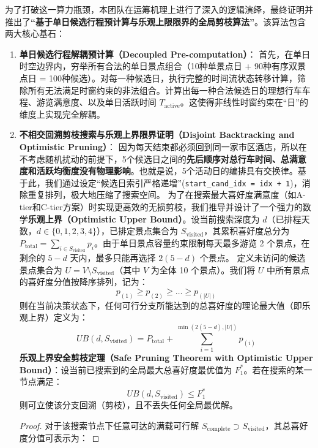 \documentclass{cumcmthesis}
\begin{document}
为了打破这一算力瓶颈，本团队在运筹机理上进行了深入的逻辑演绎，最终证明并推出了\textbf{“基于单日候选行程预计算与乐观上限限界的全局剪枝算法”}。该算法包含两大核心基石：
\begin{enumerate}
\item \textbf{单日候选行程解耦预计算（Decoupled Pre-computation）}：
首先，在单日时空边界内，穷举所有合法的单日景点组合（10种单景点日 + 90种有序双景点日 = 100种候选）。对每一种候选日，执行完整的时间流状态转移计算，筛除所有无法满足时窗约束的非法组合。计算出每一种合法候选日的理想行车车程、游览满意度、以及单日活跃时间 $T_{\text{active}}$。这使得非线性时窗约束在“日”的维度上实现完全解耦。
\item \textbf{不相交回溯剪枝搜索与乐观上界限界证明（Disjoint Backtracking and Optimistic Pruning）}：
因为每天结束都必须回到同一家市区酒店，所以在不考虑随机扰动的前提下，5个候选日之间的\textbf{先后顺序对总行车时间、总满意度和活跃均衡度没有物理影响}。也就是说，5个活动日的编排具有交换律。基于此，我们通过设定“候选日索引严格递增”(\texttt{start\_cand\_idx = idx + 1})，消除重复排列，极大地压缩了搜索空间。
为了在搜索最大喜好度满意度（如A-tier和C-tier方案）时实现更高效的无损剪枝，我们推导并设计了一个强力的数学\textbf{乐观上界（Optimistic Upper Bound）}。设当前搜索深度为 $d$（已排程天数，$d \in \{0, 1, 2, 3, 4\}$），已排定景点集合为 $S_{\text{visited}}$，其累积喜好度总分为 $P_{\text{total}} = \sum_{i \in S_{\text{visited}}} p_i$。由于单日景点容量约束限制每天最多游览 2 个景点，在剩余的 $5-d$ 天内，最多只能再选择 $2(5-d)$ 个景点。
定义未访问的候选景点集合为 $U = V \setminus S_{\text{visited}}$（其中 $V$ 为全体 10 个景点）。我们将 $U$ 中所有景点的喜好度分值按降序排列，记为：
\begin{equation}
p_{(1)} \ge p_{(2)} \ge \dots \ge p_{(|U|)}
\end{equation}
则在当前决策状态下，任何可行分支所能达到的总喜好度的理论最大值（即乐观上界）定义为：
\begin{equation}
UB(d, S_{\text{visited}}) = P_{\text{total}} + \sum_{i=1}^{\min\left(2(5-d), |U|\right)} p_{(i)}
\end{equation}
\textbf{乐观上界安全剪枝定理（Safe Pruning Theorem with Optimistic Upper Bound）}：设当前已搜索到的全局最大总喜好度最优值为 $F_1^*$。若在搜索的某一节点满足：
\begin{equation}
UB(d, S_{\text{visited}}) \le F_1^*
\end{equation}
则可立使该分支回溯（剪枝），且不丢失任何全局最优解。
\begin{proof}
对于该搜索节点下任意可达的满载可行解 $S_{\text{complete}} \supset S_{\text{visited}}$，其总喜好度分值可表示为：

\end{proof}
\end{enumerate}
\end{document}
